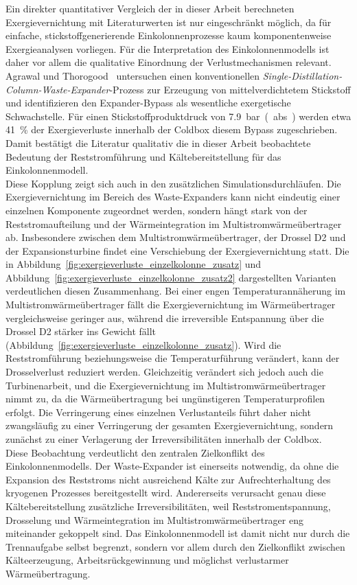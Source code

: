 Ein direkter quantitativer Vergleich der in dieser Arbeit berechneten Exergievernichtung mit Literaturwerten ist nur eingeschränkt möglich, da für einfache, stickstoffgenerierende Einkolonnenprozesse kaum komponentenweise Exergieanalysen vorliegen. Für die Interpretation des Einkolonnenmodells ist daher vor allem die qualitative Einordnung der Verlustmechanismen relevant. Agrawal und Thorogood~\cite{agrawalProductionMediumPressure1991} untersuchen einen konventionellen \textit{Single-Distillation-Column-Waste-Expander}-Prozess zur Erzeugung von mittelverdichtetem Stickstoff und identifizieren den Expander-Bypass als wesentliche exergetische Schwachstelle. Für einen Stickstoffproduktdruck von \SI{7.9}{bar(abs.)} werden etwa \SI{41}{\percent} der Exergieverluste innerhalb der Coldbox diesem Bypass zugeschrieben. Damit bestätigt die Literatur qualitativ die in dieser Arbeit beobachtete Bedeutung der Reststromführung und Kältebereitstellung für das Einkolonnenmodell.\\
Diese Kopplung zeigt sich auch in den zusätzlichen Simulationsdurchläufen. Die Exergievernichtung im Bereich des Waste-Expanders kann nicht eindeutig einer einzelnen Komponente zugeordnet werden, sondern hängt stark von der Reststromaufteilung und der Wärmeintegration im Multistromwärmeübertrager ab. Insbesondere zwischen dem Multistromwärmeübertrager, der Drossel D2 und der Expansionsturbine findet eine Verschiebung der Exergievernichtung statt. Die in Abbildung~\ref{fig:exergieverluste_einzelkolonne_zusatz} und Abbildung~\ref{fig:exergieverluste_einzelkolonne_zusatz2} dargestellten Varianten verdeutlichen diesen Zusammenhang. Bei einer engen Temperaturannäherung im Multistromwärmeübertrager fällt die Exergievernichtung im Wärmeübertrager vergleichsweise geringer aus, während die irreversible Entspannung über die Drossel D2 stärker ins Gewicht fällt (Abbildung~\ref{fig:exergieverluste_einzelkolonne_zusatz}). Wird die Reststromführung beziehungsweise die Temperaturführung verändert, kann der Drosselverlust reduziert werden. Gleichzeitig verändert sich jedoch auch die Turbinenarbeit, und die Exergievernichtung im Multistromwärmeübertrager nimmt zu, da die Wärmeübertragung bei ungünstigeren Temperaturprofilen erfolgt. Die Verringerung eines einzelnen Verlustanteils führt daher nicht zwangsläufig zu einer Verringerung der gesamten Exergievernichtung, sondern zunächst zu einer Verlagerung der Irreversibilitäten innerhalb der Coldbox.\\
Diese Beobachtung verdeutlicht den zentralen Zielkonflikt des Einkolonnenmodells. Der Waste-Expander ist einerseits notwendig, da ohne die Expansion des Reststroms nicht ausreichend Kälte zur Aufrechterhaltung des kryogenen Prozesses bereitgestellt wird. Andererseits verursacht genau diese Kältebereitstellung zusätzliche Irreversibilitäten, weil Reststromentspannung, Drosselung und Wärmeintegration im Multistromwärmeübertrager eng miteinander gekoppelt sind. Das Einkolonnenmodell ist damit nicht nur durch die Trennaufgabe selbst begrenzt, sondern vor allem durch den Zielkonflikt zwischen Kälteerzeugung, Arbeitsrückgewinnung und möglichst verlustarmer Wärmeübertragung.\\

